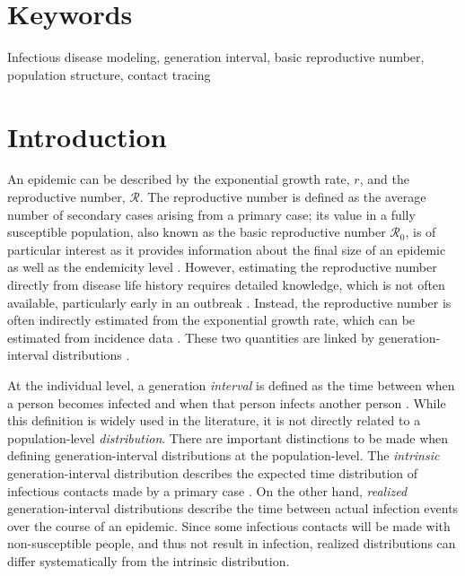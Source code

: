 \documentclass[12pt]{article}
\newcommand{\Rx}[1]{\ensuremath{{\mathcal R}_{#1}}\xspace}
\newcommand{\Ro}{\Rx{0}}
\newcommand{\RR}{\ensuremath{{\mathcal R}}}
\begin{document}
\section*{Keywords}

Infectious disease modeling, generation interval, basic reproductive number, population structure, contact tracing

\pagebreak

\section{Introduction}

An epidemic can be described by the exponential growth rate, $r$, and the reproductive number, \RR.
The reproductive number is defined as the average number of secondary cases arising from a primary case;
its value in a fully susceptible population, also known as the basic reproductive number \Ro, is of particular interest as it provides information about the final size of an epidemic \citep{anderson1991infectious, diekmann1990definition} as well as the endemicity level \citep{kribs2000simple, van2002reproduction, smith2012ross}.
However, estimating the reproductive number directly from disease life history requires detailed knowledge, which is not often available, particularly early in an outbreak \citep{dietz1993estimation}.
Instead, the reproductive number is often indirectly estimated from the exponential growth rate, which can be estimated from incidence data \citep{chowell2003sars, mills2004transmissibility, nishiura2009transmission, nishiura2010pros, ma2014estimating}.
These two quantities are linked by generation-interval distributions \citep{wearing2005appropriate, svensson2007note, roberts2007model, wallinga2007generation, park2019practical}.

At the individual level, a generation \emph{interval} is defined as the time between when a person becomes infected and when that person infects another person \citep{svensson2007note}.
While this definition is widely used in the literature, it is not directly related to a population-level \emph{distribution}.
There are important distinctions to be made when defining generation-interval distributions at the population-level. The \emph{intrinsic} generation-interval distribution describes the expected time distribution of infectious contacts made by a primary case \citep{champredon2015intrinsic}.
On the other hand, \emph{realized} generation-interval distributions describe the time between actual infection events over the course of an epidemic.
Since some infectious contacts will be made with non-susceptible people, and thus not result in infection, realized distributions can differ systematically from the intrinsic distribution.
\end{document}
